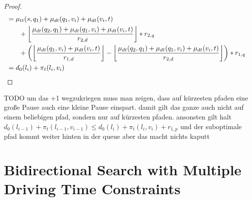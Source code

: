 \begin{proof}
\begin{align}
\begin{split}
			&= \traveltime(s, q_1) + \drivingtime(q_1,v_{i}) + \drivingtime(v_{i},t)\\
			& \phantom{{}=1} + \floor*{ \frac{\drivingtime(q_2,q_1) + \drivingtime(q_1,v_{i}) + \drivingtime(v_{i},t)}{\restr_{2,d}} } * \restr_{2,q}\\
			& \phantom{{}=1} + \left( \floor*{ \frac{\drivingtime(q_1,v_{i})  + \drivingtime(v_{i},t)}{\restr_{1,d}} } - \floor*{ \frac{\drivingtime(q_2,q_1) + \drivingtime(q_1,v_{i}) + \drivingtime(v_{i},t)}{\restr_{2,d}} }\right) * \restr_{1,q}\\
			&= d_0(l_{i}) + \pi_t(l_{i},v_{i})
		\end{split}
	\end{align}
\end{proof}

TODO um das +1 wegzukriegen muss man zeigen, dass auf kürzesten pfaden eine große Pause auch eine kleine Pause einspart. damit gilt das ganze auch nicht auf einem beliebigen pfad, sondern nur auf kürzesten pfaden. ansonsten gilt halt $d_0(l_{i-1}) + \pi_t(l_{i-1},v_{i-1}) \le d_0(l_{i}) + \pi_t(l_{i},v_{i}) + r_{1,p}$ und der suboptimale pfad kommt weiter hinten in der queue aber das macht nichts kaputt

\section{Bidirectional Search with Multiple Driving Time Constraints}

